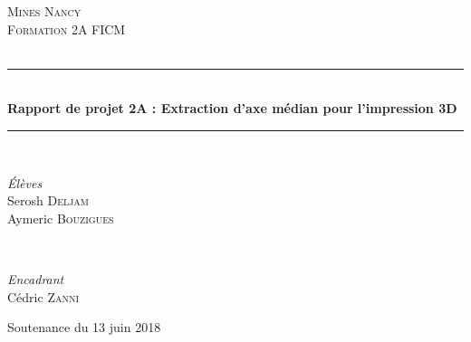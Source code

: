 \documentclass[11pt]{article}
\begin{document}

\begin{titlepage} %
	\newcommand{\HRule}{\rule{\linewidth}{0.5mm}} %
	
	\center %
	
	
	\textsc{\LARGE Mines Nancy}\\[1.5cm] %
	
	\textsc{\Large Formation 2A FICM}\\[0.5cm] %
	
	\textsc{\large }\\[0.5cm] %
	

	\HRule\\[0.4cm]
	
	{\huge\bfseries Rapport de projet 2A : Extraction d'axe médian pour l'impression 3D}\\[0.4cm] %
	
	\HRule\\[1.5cm]
	
	\begin{minipage}{0.4\textwidth}
		\begin{flushleft}
			\large
			\textit{Élèves}\\
			Serosh \textsc{Deljam} \\
			Aymeric \textsc{Bouzigues}
		\end{flushleft}
	\end{minipage}
	~
	\begin{minipage}{0.4\textwidth}
		\begin{flushright}
			\large
			\textit{Encadrant}\\
			Cédric \textsc{Zanni} %
		\end{flushright}
	\end{minipage}
	
	
	
	\vfill\vfill\vfill 
	
	{\large Soutenance du 13 juin 2018}
	
	
	
	\vfill
\end{titlepage}
\end{document}
